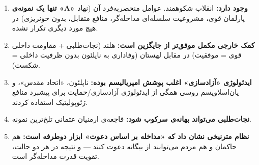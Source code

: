 \begin{tcolorbox}[wavebox, title={یافته‌های کلیدی فصل ۸}]
\begin{enumerate}[nosep, label=\textbf{\arabic*.}]
  \item \textbf{تنها یک نمونه‌ی «A» وجود دارد:} انقلاب شکوهمند. عوامل منحصربه‌فرد آن (نهاد پارلمان قوی، مشروعیت سلسله‌ای مداخله‌گر، منافع متقابل، بدون خونریزی) در هیچ مورد دیگری تکرار نشده.

  \item \textbf{کمک خارجی مکمل موفق‌تر از جایگزین است:} هلند (نجات‌طلبی + مقاومت داخلی قوی = موفقیت) در مقابل لهستان (وفاداری به ناپلئون بدون ظرفیت داخلی = شکست).

  \item \textbf{ایدئولوژی «آزادسازی» اغلب پوشش امپریالیسم بوده:} ناپلئون، «اتحاد مقدس»، و پان‌اسلاویسم روسی همگی از ایدئولوژی آزادسازی/حمایت برای پیشبرد منافع ژئوپولیتیک استفاده کردند.

  \item \textbf{نجات‌طلبی می‌تواند بهانه‌ی سرکوب شود:} فاجعه‌ی ارمنیان عثمانی تلخ‌ترین نمونه.

  \item \textbf{نظام مترنیخی نشان داد که «مداخله بر اساس دعوت» ابزار دوطرفه است:} هم حاکمان و هم مردم می‌توانند از بیگانه دعوت کنند — و نتیجه در هر دو حالت، تقویت قدرت مداخله‌گر است.
\end{enumerate}
\end{tcolorbox}

\cleardoublepage